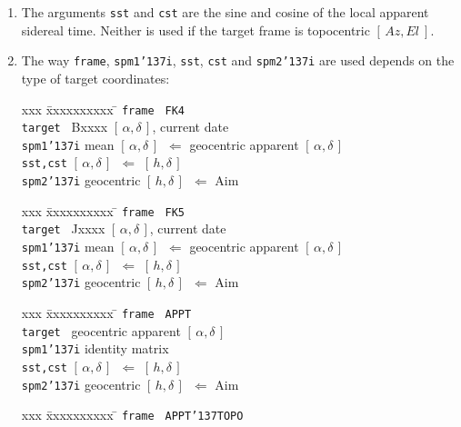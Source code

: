 \documentclass[12pt,fleqn,twoside]{article}
\renewcommand{\_}{{\tt\char'137}}     %
\newcommand{\radec}     {$[\,\alpha,\delta\,]$}
\newcommand{\hadec}     {$[\,h,\delta\,]$}
\newcommand{\azel}      {$[\,Az,El~]$}
\begin{document}
{\begin{enumerate}
      In the present case, the sky coordinates are predicted (in
      Cartesian form), starting from the {\sc Aim} vector.
\item The arguments {\tt sst} and {\tt cst}
      are the sine and cosine of the local
      apparent sidereal time.  Neither is used if the target frame is
      topocentric \azel.
\item The way {\tt frame}, {\tt spm1\_i}, {\tt sst}, {\tt cst} and
      {\tt spm2\_i} are used depends on the type of target coordinates:
      \begin{tabbing}
         xxx \= xxxxxxxxxx \= \kill
         \> {\tt frame  } \> {\tt FK4} \\
         \> {\tt target } \> Bxxxx \radec, current date \\
         \> {\tt spm1\_i} \>
                 mean \radec\ $\Leftarrow$ geocentric apparent \radec \\
         \> {\tt sst,cst} \> \radec\ $\Leftarrow$ \hadec \\
         \> {\tt spm2\_i} \>  geocentric \hadec\ $\Leftarrow$ {\sc Aim}
      \end{tabbing}
      \begin{tabbing}
         xxx \= xxxxxxxxxx \= \kill
         \> {\tt frame  } \> {\tt FK5} \\
         \> {\tt target } \> Jxxxx \radec, current date \\
         \> {\tt spm1\_i} \>
                 mean \radec\ $\Leftarrow$ geocentric apparent \radec \\
         \> {\tt sst,cst} \> \radec\ $\Leftarrow$ \hadec \\
         \> {\tt spm2\_i} \> geocentric \hadec\ $\Leftarrow$ {\sc Aim}
      \end{tabbing}
      \begin{tabbing}
         xxx \= xxxxxxxxxx \= \kill
         \> {\tt frame  } \> {\tt APPT} \\
         \> {\tt target } \> geocentric apparent \radec \\
         \> {\tt spm1\_i} \> identity matrix \\
         \> {\tt sst,cst} \> \radec\ $\Leftarrow$ \hadec \\
         \> {\tt spm2\_i} \> geocentric \hadec\ $\Leftarrow$ {\sc Aim}
      \end{tabbing}
      \begin{tabbing}
         xxx \= xxxxxxxxxx \= \kill
         \> {\tt frame  } \> {\tt APPT\_TOPO} \\

\end{tabbing}
\end{enumerate}}
\end{document}
